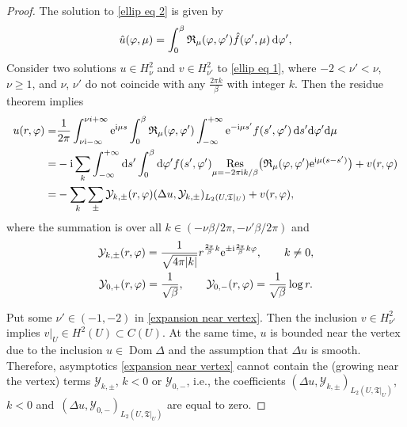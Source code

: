 \documentclass[pdftex]{sigma}
\numberwithin{equation}{section}
\theoremstyle{definition}
\begin{document}
\begin{proof}
The solution to \eqref{ellip eq 2} is given by
\[\hat{u}(\varphi,\mu)=\int_{0}^{\beta}\mathfrak{R}_\mu(\varphi,\varphi')\hat{f}(\varphi',\mu)\,{\rm d}\varphi', \]
Consider two solutions $u\in H^2_{\nu}$ and $v\in H^2_{\nu'}$ to \eqref{ellip eq 1}, where $-2<\nu'<\nu$, $\nu\ge 1$, and $\nu$, $\nu'$ do not coincide with any $\frac{2\pi k}{\beta}$ with integer $k$. Then the residue theorem implies
\begin{align}
u(r,\varphi)=&\frac{1}{2\pi}\int_{\nu {\rm i}-\infty}^{\nu i+\infty}{\rm e}^{{\rm i}\mu s}\int_{0}^{\beta}\mathfrak{R}_\mu(\varphi,\varphi')\int_{-\infty}^{+\infty}{\rm e}^{-{\rm i}\mu s'}f(s',\varphi')\, {\rm d}s' {\rm d}\varphi'{\rm d}\mu\nonumber\\
=&-{\rm i}\sum_{k}\int_{-\infty}^{+\infty}{\rm d}s'\int_{0}^{\beta}{\rm d}\varphi'f(s',\varphi')\underset{\mu=-2\pi {\rm i} k/\beta}{\rm Res}\bigl(\mathfrak{R}_\mu(\varphi,\varphi'){\rm e}^{{\rm i}\mu (s-s')}\bigr)+v(r,\varphi)\nonumber\\
=&-\sum_{k}\sum_{\pm}\mathcal{Y}_{k,\pm}(r,\varphi)(\Delta u,\mathcal{Y}_{k,\pm})_{L_2(U,\mathfrak{T}|_U)}+v(r,\varphi),\label{expansion near vertex}
\end{align}
where the summation is over all $k\in (-\nu\beta/2\pi,-\nu'\beta/2\pi)$ and
\begin{gather*}
\mathcal{Y}_{k,\pm}(r,\varphi)=\frac{1}{\sqrt{4\pi |k|}}r^{\frac{2\pi}{\beta}k}{\rm e}^{\pm {\rm i}\frac{2\pi}{\beta}k\varphi} ,\qquad k\ne 0,\\
\mathcal{Y}_{0,+}(r,\varphi)=\frac{1}{\sqrt{\beta}}, \qquad \mathcal{Y}_{0,-}(r,\varphi)=\frac{1}{\sqrt{\beta}}\log r.
\end{gather*}

Put some $\nu'\in (-1,-2)$ in \eqref{expansion near vertex}. Then the inclusion $v\in H^2_{\nu'}$ implies $v|_U\in H^2(U)\subset C(U)$. At the same time, $u$ is bounded near the vertex due to the inclusion $u\in \operatorname{Dom}\Delta$ and the assumption that $\Delta u$ is smooth. Therefore, asymptotics \eqref{expansion near vertex} cannot contain the (growing near the vertex) terms $\mathcal{Y}_{k,\pm}$, $k<0$ or $\mathcal{Y}_{0,-}$, i.e., the coefficients $(\Delta u,\mathcal{Y}_{k,\pm})_{L_2(U,\mathfrak{T}|_U)}$, $k<0$ and~${(\Delta u,\mathcal{Y}_{0,-})_{L_2(U,\mathfrak{T}|_U)}}$ are equal to zero.


\end{proof}
\end{document}
